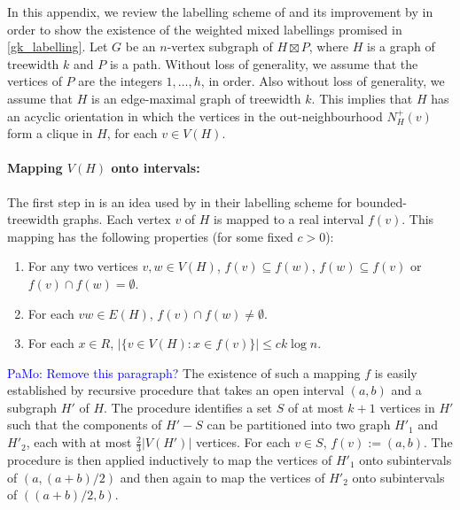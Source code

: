 \documentclass{patmorin}
\DeclareMathOperator{\height}{height}
\renewcommand{\le}{\leqslant}
\newcommand{\pat}[1]{\textcolor{Blue}{PaMo: #1}}
\newcommand{\defin}[1]{\emph{\textcolor{brightmaroon}{#1}}}
\begin{document}



  In this appendix, we review the labelling scheme of \citet{dujmovic.esperet.ea:adjacency} and its improvement by \citet{alstrup.rauhe:improved} in order to show the existence of the weighted mixed labellings promised in \cref{gk_labelling}.
  Let $G$ be an $n$-vertex subgraph of $H\boxtimes P$, where $H$ is a graph of treewidth $k$ and $P$ is a path.  Without loss of generality, we assume that the vertices of $P$ are the integers $1,\ldots,h$, in order.   Also without loss of generality, we assume that $H$ is an edge-maximal graph of treewidth $k$.  This implies that $H$ has an acyclic orientation in which the vertices in the out-neighbourhood $N^+_H(v)$ form a clique in $H$, for each $v\in V(H)$.


  \paragraph{\boldmath Mapping $V(H)$ onto intervals:}
  The first step in \cite{dujmovic.esperet.ea:adjacency} is an idea used by \citet{gavoille.labourel:shorter} in their labelling scheme for bounded-treewidth graphs.  Each vertex $v$ of $H$ is mapped to a real interval \defin{$f(v)$}. This mapping has the following properties (for some fixed $c>0$):
  \begin{enumerate}
      \item\label{nested_or_disjoint} For any two vertices $v,w\in V(H)$, $f(v)\subseteq f(w)$, $f(w)\subseteq f(v)$ or $f(v)\cap f(w)=\emptyset$.
      \item\label{intersection_subgraph} For each $vw\in E(H)$, $f(v)\cap f(w)\neq\emptyset$.
      \item\label{thin} For each $x\in R$, $|\{v\in V(H):x\in f(v)\}|\le ck\log n$.
  \end{enumerate}
  \pat{Remove this paragraph?} The existence of such a mapping $f$ is easily established by recursive procedure  that takes an open interval $(a,b)$ and a subgraph $H'$ of $H$.  The procedure identifies a set $S$ of at most $k+1$ vertices  in $H'$ such that the components of $H'-S$ can be partitioned into two graph $H'_1$ and $H'_2$, each with at most $\tfrac{2}{3}|V(H')|$ vertices. For each $v\in S$, $f(v):=(a,b)$.  The procedure is then applied inductively to map the vertices of $H'_1$ onto subintervals of $(a,(a+b)/2)$ and then again to map the vertices of $H'_2$ onto subintervals of $((a+b)/2,b)$.
\end{document}
